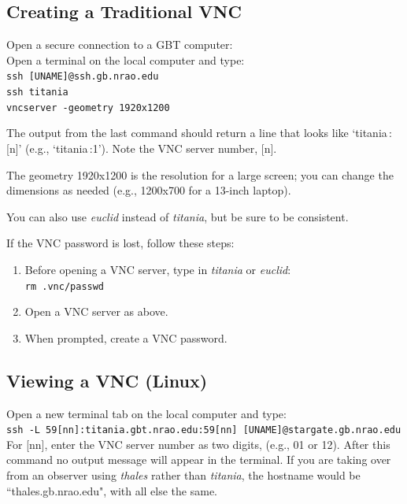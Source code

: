 \documentclass[11pt, reqno, tbtags]{article}
\begin{document}
\subsection{Creating a Traditional VNC}\label{ssec:vnc}  %
Open a secure connection to a GBT computer: \\
Open a terminal on the local computer and type: \\
\indent\texttt{ssh [UNAME]@ssh.gb.nrao.edu \\
\indent ssh titania \\                                                    
\indent vncserver -geometry 1920x1200}

\noindent The output from the last command should return a line that looks like `titania\,:[n]' (e.g., `titania\,:1'). Note the VNC server number, [n].         

\noindent The geometry 1920x1200 is the resolution for a large screen; you can change the dimensions as needed (e.g., 1200x700 for a 13-inch laptop).  

\noindent You can also use \textit{euclid} instead of \textit{titania}, but be sure to be consistent.      

\noindent If the VNC password is lost, follow these steps: \begin{enumerate}
 \item Before opening a VNC server, type in \textit{titania} or \textit{euclid}: \\            
 \texttt{rm .vnc/passwd}
 \item Open a VNC server as above.  
 \item When prompted, create a VNC password. 
\end{enumerate}

\subsection{Viewing a VNC (Linux)} \label{ssec:vncl}  %
Open a new terminal tab on the local computer and type: \\
\indent\texttt{ssh -L 59[nn]:titania.gbt.nrao.edu:59[nn] [UNAME]@stargate.gb.nrao.edu} \\          
For [nn], enter the VNC server number as two digits, (e.g., 01 or 12). After this command no output message will appear in the terminal.  If you are taking over from an observer using \textit{thales} rather than \textit{titania}, the hostname would be ``thales.gb.nrao.edu", with all else the same.    
\end{document}

